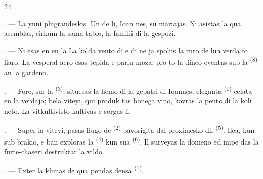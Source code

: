 %

\begin{VUpage}[26]{24}
\VUsaut{4.0mm}
\VUsaut{1.6mm}
\VUsaut{3.2mm}

\VUsaut{1.6mm}
\VUsaut{2.6mm}

\VUsaut{3.0mm}

. --- La yuni plugrandeskis. Un de li, Ioan\cc
nes, su mariajas. Ni asistas la \nl
qua asemblas, cirkum la sama tablo, la familii\nl
di la gespozi.

. --- Ni esas en  en la \cc
{} La kolda vento di  e di \cc
{} ne ja spoliis la ruro de lua verda fo\cc
liaro. La vesperal aero esas tepida e parfu\cc
moza; pro to la dineo eventas sub la  \textsuperscript{(8)}\nl
an la gardeno.

. --- Fore, sur la  \textsuperscript{(3)}, situesas la hemo\nl
di la gepatri di Ioannes, eleganta  \textsuperscript{(1)}\nl
celata en la verdajo; bela viteyi, qui produk\cc
tas bonega vino, kovras la pento di la koli\cc
neto. La vitkultivisto kultivas e sorgas li.

. --- Super la viteyi, pasas flugo de \cc
{} \textsuperscript{(2)} pavorigita dal proximesko dil \cc
{} \textsuperscript{(5)}. Ilca, kun  sub brakio, e ban\cc
{} exploras la  \textsuperscript{(4)} kun\nl
sua  \textsuperscript{(6)}. Il surveyas la domeno ed impe\cc
das la furte-chaseri destruktar la vildo.

. --- Exter la  klimas \nl
de qua pendas densa  \textsuperscript{(7)}.
\end{VUpage}

